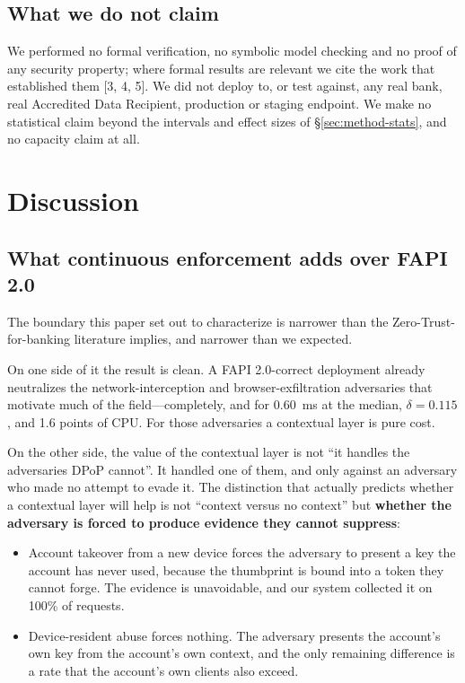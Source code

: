 \subsection{What we do not claim}

We performed no formal verification, no symbolic model checking and no proof of any security property; where formal results are relevant we cite the work that established them [3, 4, 5]. We did not deploy to, or test against, any real bank, real Accredited Data Recipient, production or staging endpoint. We make no statistical claim beyond the intervals and effect sizes of \S\ref{sec:method-stats}, and no capacity claim at all.

\section{Discussion}
\label{sec:discussion}

\subsection{What continuous enforcement adds over FAPI 2.0}

The boundary this paper set out to characterize is narrower than the Zero-Trust-for-banking literature implies, and narrower than we expected.

On one side of it the result is clean. A FAPI 2.0-correct deployment already neutralizes the network-interception and browser-exfiltration adversaries that motivate much of the field---completely, and for 0.60~ms at the median, $\delta = 0.115$, and 1.6 points of CPU. For those adversaries a contextual layer is pure cost.

On the other side, the value of the contextual layer is not ``it handles the adversaries DPoP cannot''. It handled one of them, and only against an adversary who made no attempt to evade it. The distinction that actually predicts whether a contextual layer will help is not ``context versus no context'' but \textbf{whether the adversary is forced to produce evidence they cannot suppress}:

\begin{itemize}
  \item Account takeover from a new device forces the adversary to present a key the account has never used, because the thumbprint is bound into a token they cannot forge. The evidence is unavoidable, and our system collected it on 100\% of requests.
  \item Device-resident abuse forces nothing. The adversary presents the account's own key from the account's own context, and the only remaining difference is a rate that the account's own clients also exceed.
\end{itemize}

